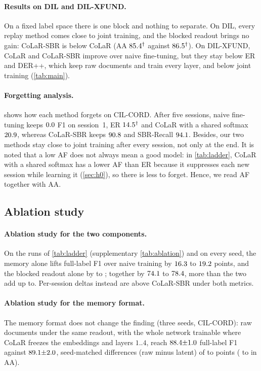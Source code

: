 \documentclass[10pt,twocolumn,letterpaper]{article}
\begin{document}
\paragraph{Results on DIL and DIL-XFUND.} On a fixed label space there is one block and nothing to separate. On DIL, every replay method comes close to joint training, and the blocked readout brings no gain: CoLaR-SBR is below CoLaR (AA $85.4^\dagger$ against $86.5^\dagger$). On DIL-XFUND, CoLaR and CoLaR-SBR improve over naive fine-tuning, but they stay below ER and DER++, which keep raw documents and train every layer, and below joint training (\cref{tab:main}).

\paragraph{Forgetting analysis.}  shows how each method forgets on CIL-CORD. After five sessions, naive fine-tuning keeps $0.0$ F1 on session~1, ER $14.5^\dagger$ and CoLaR with a shared softmax $20.9$, whereas CoLaR-SBR keeps $90.8$ and SBR-Recall $94.1$. Besides, our two methods stay close to joint training after every session, not only at the end. It is noted that a low AF does not always mean a good model: in \cref{tab:ladder}, CoLaR with a shared softmax has a lower AF than ER because it suppresses each new session while learning it (\cref{sec:h0}), so there is less to forget. Hence, we read AF together with AA.

\subsection{Ablation study}
\label{sec:ablations}
\paragraph{Ablation study for the two components.} On the runs of \cref{tab:ladder} (supplementary \cref{tab:ablation}) and on every seed, the memory alone lifts full-label F1 over naive training by $16.3$ to $19.2$ points, and the blocked readout alone by \nAblReadMin{} to \nAblReadMax; together by $74.1$ to $78.4$, more than the two add up to. Per-session deltas instead are above CoLaR-SBR under both metrics.

\paragraph{Ablation study for the memory format.} The memory format does not change the finding (three seeds, CIL-CORD): raw documents under the same readout, with the whole network trainable where CoLaR freezes the embeddings and layers $1..4$, reach $88.4{\pm}1.0$ full-label F1 against $89.1{\pm}2.0$, seed-matched differences (raw minus latent) of \nErSbrDiffFullMin{} to \nErSbrDiffFullMax{} points (\nErSbrDiffAaMin{} to \nErSbrDiffAaMax{} in AA).
\end{document}
